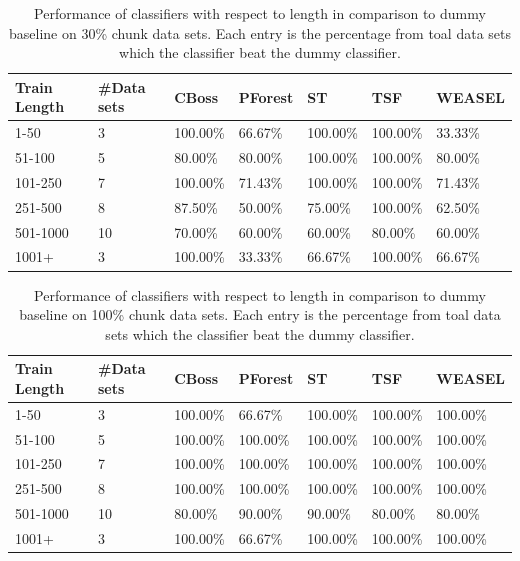         \begin{table}[!ht]
            \setlength\extrarowheight{2pt} %
            \begin{tabularx}{\textwidth}{|X|X|X|X|X|X|X|}
            \hline
            \textbf{Train Length} & \textbf{\#Data sets} & \textbf{CBoss} & \textbf{PForest} & \textbf{ST} & \textbf{TSF} & \textbf{WEASEL} \\ \hline
                1-50 & 3 & 100.00\% & 66.67\% & 100.00\% & 100.00\% & 33.33\%\\ \hline
                51-100 & 5 & 80.00\% & 80.00\% & 100.00\% & 100.00\% & 80.00\% \\ \hline
                101-250 & 7 & 100.00\% & 71.43\% & 100.00\% & 100.00\% & 71.43\% \\ \hline
                251-500 & 8 & 87.50\% & 50.00\% & 75.00\% & 100.00\% & 62.50\% \\ \hline
                501-1000 & 10 &70.00\% & 60.00\% & 60.00\% & 80.00\% & 60.00\% \\ \hline
                1001+ & 3 & 100.00\% & 33.33\% & 66.67\% & 100.00\% & 66.67\% \\ \hline
            \end{tabularx}
            \caption{Performance of classifiers with respect to length in comparison to dummy baseline on 30\% chunk data sets. Each entry is the percentage from toal data sets which the classifier beat the dummy classifier.}
        \end{table}

        \begin{table}[!ht]
            \setlength\extrarowheight{2pt} %
            \begin{tabularx}{\textwidth}{|X|X|X|X|X|X|X|}
            \hline
            \textbf{Train Length} & \textbf{\#Data sets} & \textbf{CBoss} & \textbf{PForest} & \textbf{ST} & \textbf{TSF} & \textbf{WEASEL} \\ \hline
                1-50 & 3 & 100.00\% & 66.67\% & 100.00\% & 100.00\% & 100.00\% \\ \hline
                51-100 & 5 & 100.00\% & 100.00\% & 100.00\% & 100.00\% & 100.00\% \\ \hline
                101-250 & 7 & 100.00\% & 100.00\% & 100.00\% & 100.00\% & 100.00\% \\ \hline
                251-500 & 8 & 100.00\% & 100.00\% & 100.00\% & 100.00\% & 100.00\% \\ \hline
                501-1000 & 10 &80.00\% & 90.00\% & 90.00\% & 80.00\% & 80.00\% \\ \hline
                1001+ & 3 & 100.00\% & 66.67\% & 100.00\% & 100.00\% & 100.00\% \\ \hline
            \end{tabularx}
            \caption{Performance of classifiers with respect to length in comparison to dummy baseline on 100\% chunk data sets. Each entry is the percentage from toal data sets which the classifier beat the dummy classifier.}
        \end{table}
    
